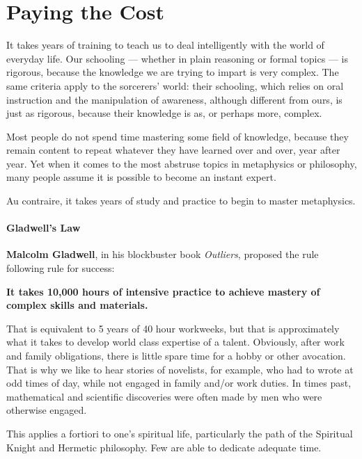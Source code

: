 \section{Paying the Cost}

\begin{quotex}
It takes years of training to teach us to deal intelligently with the world of everyday life. Our schooling --- whether in plain reasoning or formal topics --- is rigorous, because the knowledge we are trying to impart is very complex. The same criteria apply to the sorcerers' world: their schooling, which relies on oral instruction and the manipulation of awareness, although different from ours, is just as rigorous, because their knowledge is as, or perhaps more, complex.
\end{quotex}

Most people do not spend time mastering some field of knowledge, because they remain content to repeat whatever they have learned over and over, year after year. Yet when it comes to the most abstruse topics in metaphysics or philosophy, many people assume it is possible to become an instant expert.

Au contraire, it takes years of study and practice to begin to master metaphysics.

\paragraph{Gladwell's Law}


\textbf{Malcolm Gladwell}, in his blockbuster book \textit{Outliers}, proposed the rule following rule for success:

\textbf{It takes 10,000 hours of intensive practice to achieve mastery of complex skills and materials.}

That is equivalent to 5 years of 40 hour workweeks, but that is approximately what it takes to develop world class expertise of a talent. Obviously, after work and family obligations, there is little spare time for a hobby or other avocation. That is why we like to hear stories of novelists, for example, who had to wrote at odd times of day, while not engaged in family and/or work duties. In times past, mathematical and scientific discoveries were often made by men who were otherwise engaged.

This applies a fortiori to one's spiritual life, particularly the path of the Spiritual Knight and Hermetic philosophy. Few are able to dedicate adequate time.

